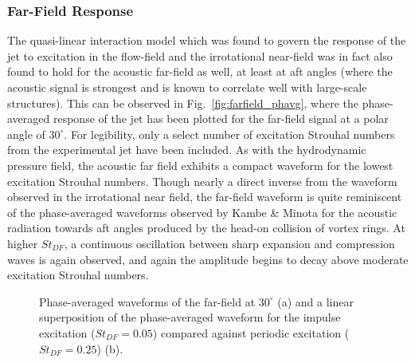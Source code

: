 \documentclass[english]{aiaa-tc}
\begin{document}
\subsubsection{Far-Field Response}
The quasi-linear interaction model which was found to govern the response of the jet to excitation in the flow-field and the irrotational near-field was in fact also found to hold for the acoustic far-field as well, at least at aft angles (where the acoustic signal is strongest and is known to correlate well with large-scale structures).
This can be observed in Fig.~\ref{fig:farfield_phavg}, where the phase-averaged response of the jet has been plotted for the far-field signal at a polar angle of $30^\circ$.
For legibility, only a select number of excitation Strouhal numbers from the experimental jet have been included.
As with the hydrodynamic pressure field, the acoustic far field exhibits a compact waveform for the lowest excitation Strouhal numbers.
Though nearly a direct inverse from the waveform observed in the irrotational near field, the far-field waveform is quite reminiscent of the phase-averaged waveforms observed by Kambe \& Minota \cite{Kambe1983} for the acoustic radiation towards aft angles produced by the head-on collision of vortex rings.
At higher $St_{DF}$, a continuous oscillation between sharp expansion and compression waves is again observed, and again the amplitude begins to decay above moderate excitation Strouhal numbers.
\begin{figure}
	\begin{centering}
	\end{centering}
	\caption{Phase-averaged waveforms of the far-field at $30^\circ$ (a) and a linear superposition of the phase-averaged waveform for the impulse excitation ($St_{DF} = 0.05$) compared against periodic excitation ($St_{DF} = 0.25$) (b).}
\end{figure}
\end{document}
